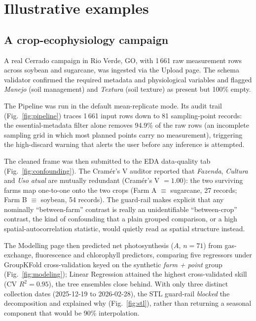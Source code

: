 \documentclass[a4paper,fleqn]{cas-dc}
\begin{document}
\section{Illustrative examples}\label{sec:examples}

\subsection{A crop-ecophysiology campaign}\label{sec:ex-physio}

A real Cerrado campaign in Rio Verde, GO, with 1\,661 raw measurement rows across soybean and sugarcane, was ingested via the Upload page. The schema validator confirmed the required metadata and physiological variables and flagged \emph{Manejo} (soil management) and \emph{Textura} (soil texture) as present but 100\% empty.

The Pipeline was run in the default mean-replicate mode. Its audit trail (Fig.~\ref{fig:pipeline}) traces 1\,661 input rows down to 81 sampling-point records: the essential-metadata filter alone removes 94.9\% of the raw rows (an incomplete sampling grid in which most planned points carry no measurement), triggering the high-discard warning that alerts the user before any inference is attempted.

The cleaned frame was then submitted to the EDA data-quality tab (Fig.~\ref{fig:confounding}). The Cram\'er's V auditor reported that \emph{Fazenda}, \emph{Cultura} and \emph{Uso atual} are mutually redundant (Cram\'er's V $=1.00$): the two surviving farms map one-to-one onto the two crops (Farm A $\equiv$ sugarcane, 27 records; Farm B $\equiv$ soybean, 54 records). The guard-rail makes explicit that any nominally ``between-farm'' contrast is really an unidentifiable ``between-crop'' contrast, the kind of confounding that a plain grouped comparison, or a high spatial-autocorrelation statistic, would quietly read as spatial structure instead.

The Modelling page then predicted net photosynthesis ($A$, $n=71$) from gas-exchange, fluorescence and chlorophyll predictors, comparing five regressors under GroupKFold cross-validation keyed on the synthetic \emph{farm + point} group (Fig.~\ref{fig:modeling}); Linear Regression attained the highest cross-validated skill (CV $R^2 = 0.95$), the tree ensembles close behind. With only three distinct collection dates (2025-12-19 to 2026-02-28), the STL guard-rail \emph{blocked} the decomposition and explained why (Fig.~\ref{fig:stl}), rather than returning a seasonal component that would be 90\% interpolation.
\end{document}
